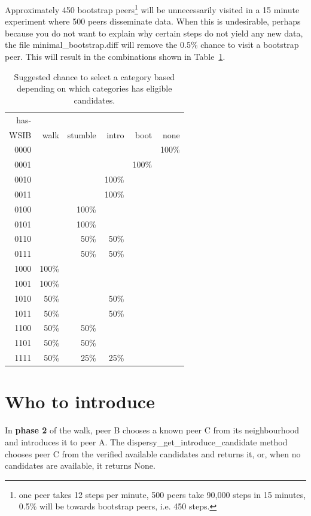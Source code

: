 Approximately 450 bootstrap peers\footnote{one peer takes 12 steps per
minute, 500 peers take 90,000 steps in 15 minutes, 0.5\% will be
towards bootstrap peers, i.e. 450 steps.} will be unnecessarily
visited in a 15 minute experiment where 500 peers disseminate data.
When this is undesirable, perhaps because you do not want to explain
why certain steps do not yield any new data, the file
minimal\_bootstrap.diff will remove the 0.5\% chance to visit a
bootstrap peer.  This will result in the combinations shown in
Table~\ref{tbl:suggested-who-to-walk-towards}.

\begin{table}[htb]
\caption{\label{tbl:suggested-who-to-walk-towards}Suggested chance to select a category based depending on which categories has eligible candidates.}
\centering
\begin{tabular}{r|rrrrr}
has- &  &  &  &  & \\
WSIB & walk & stumble & intro & boot & none\\
\hline
0000 &  &  &  &  & 100\%\\
0001 &  &  &  & 100\% & \\
0010 &  &  & 100\% &  & \\
0011 &  &  & 100\% &  & \\
0100 &  & 100\% &  &  & \\
0101 &  & 100\% &  &  & \\
0110 &  & 50\% & 50\% &  & \\
0111 &  & 50\% & 50\% &  & \\
1000 & 100\% &  &  &  & \\
1001 & 100\% &  &  &  & \\
1010 & 50\% &  & 50\% &  & \\
1011 & 50\% &  & 50\% &  & \\
1100 & 50\% & 50\% &  &  & \\
1101 & 50\% & 50\% &  &  & \\
1111 & 50\% & 25\% & 25\% &  & \\
\end{tabular}
\end{table}
\section{Who to introduce}
\label{sec-4}
In \textbf{phase 2} of the walk, peer B chooses a known peer C from its
neighbourhood and introduces it to peer A.  The
dispersy\_get\_introduce\_candidate method\footnotemark[3]{} chooses peer C
from the verified available candidates and returns it, or, when no
candidates are available, it returns None.

